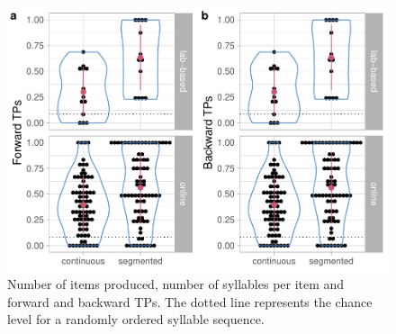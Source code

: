 \documentclass[
]{article}
\begin{document}
\begin{figure}

{\centering \includegraphics[width=0.8\linewidth]{segmentation_recall_combined_for_revision2_files/figure-latex/recall-general-measures-tp-plot-tps-1} 

}

\caption{Number of items produced, number of syllables per item and forward and backward TPs. The dotted line represents the chance level for a randomly ordered syllable sequence.}\label{fig:recall-general-measures-tp-plot-tps}
\end{figure}
\end{document}
